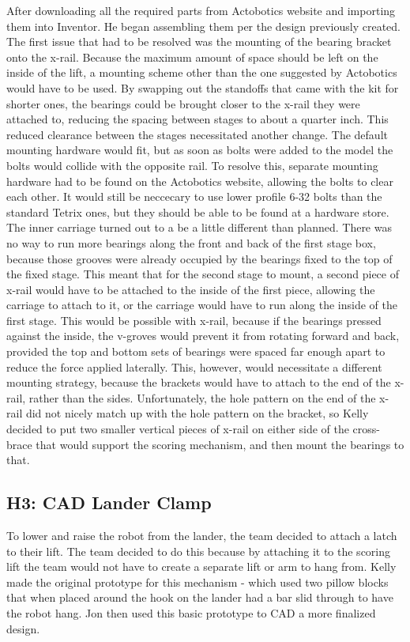 \documentclass{article}
\begin{document}
 After downloading all the required parts from Actobotics website and importing them into Inventor. He began assembling them per the design previously created. The first issue that had to be resolved was the mounting of the bearing bracket onto the x-rail. Because the maximum amount of space should be left on the inside of the lift, a mounting scheme other than the one suggested by Actobotics would have to be used. By swapping out the standoffs that came with the kit for shorter ones, the bearings could be brought closer to the x-rail they were attached to, reducing the spacing between stages to about a quarter inch. This reduced clearance between the stages necessitated another change. The default mounting hardware would fit, but as soon as bolts were added to the model the bolts would collide with the opposite rail. To resolve this, separate mounting hardware had to be found on the Actobotics website, allowing the bolts to clear each other. It would still be neccecary to use lower profile 6-32 bolts than the standard Tetrix ones, but they should be able to be found at a hardware store. The inner carriage turned out to a be a little different than planned. There was no way to run more bearings along the front and back of the first stage box, because those grooves were already occupied by the bearings fixed to the top of the fixed stage. This meant that for the second stage to mount, a second piece of x-rail would have to be attached to the inside of the first piece, allowing the carriage to attach to it, or the carriage would have to run along the inside of the first stage. This would be possible with x-rail, because if the bearings pressed against the inside, the v-groves would prevent it from rotating forward and back, provided the top and bottom sets of bearings were spaced far enough apart to reduce the force applied laterally. This, however, would necessitate a different mounting strategy, because the brackets would have to attach to the end of the x-rail, rather than the sides. Unfortunately, the hole pattern on the end of the x-rail did not nicely match up with the hole pattern on the bracket, so Kelly decided to put two smaller vertical pieces of x-rail on either side of the cross-brace that would support the scoring mechanism, and then mount the bearings to that. 

\subsection{H3: CAD Lander Clamp}

To lower and raise the robot from the lander, the team decided to attach a latch to their lift. The team decided to do this because by attaching it to the scoring lift the team would not have to create a separate lift or arm to hang from. Kelly made the original prototype for this mechanism - which used two pillow blocks that when placed around the hook on the lander had a bar slid through to have the robot hang. Jon then used this basic prototype to CAD a more finalized design.
\end{document}
